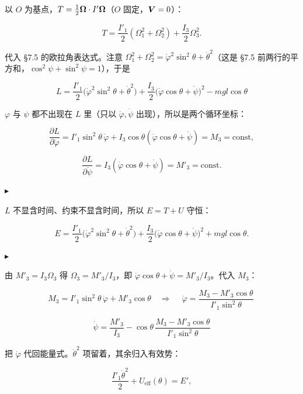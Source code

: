 \documentclass[11pt]{ctexart}
\newcommand{\step}[1]{\par\vspace{3pt}\noindent
  {\color{violet}\small$\blacktriangleright$}\hspace{3pt}{\bfseries\color{violetdeep}#1}\par\vspace{1pt}}
\begin{document}

以 $O$ 为基点，$T=\frac12\boldsymbol{\Omega}\cdot I'\boldsymbol{\Omega}$（$O$ 固定，$\boldsymbol{V}=0$）：

\[
T=\frac{I'_1}{2}(\Omega_1^2+\Omega_2^2)+\frac{I_3}{2}\Omega_3^2 .
\]

代入 \S7.5 的欧拉角表达式。注意 $\Omega_1^2+\Omega_2^2=\dot\varphi^2\sin^2\theta+\dot\theta^2$（这是 \S7.5 前两行的平方和，$\cos^2\psi+\sin^2\psi=1$），于是

\[
\boxed{\ L=\frac{I'_1}{2}\bigl(\dot\varphi^2\sin^2\theta+\dot\theta^2\bigr)
+\frac{I_3}{2}\bigl(\dot\varphi\cos\theta+\dot\psi\bigr)^2-mgl\cos\theta\ }
\]


$\varphi$ 与 $\psi$ 都不出现在 $L$ 里（只以 $\dot\varphi,\dot\psi$ 出现），所以是两个循环坐标：

\[
\frac{\partial L}{\partial\dot\varphi}=I'_1\sin^2\theta\,\dot\varphi+I_3\cos\theta(\dot\varphi\cos\theta+\dot\psi)=M_3=\text{const},
\]

\[
\frac{\partial L}{\partial\dot\psi}=I_3(\dot\varphi\cos\theta+\dot\psi)=M'_3=\text{const}.
\]


\step{能量}
$L$ 不显含时间、约束不显含时间，所以 $E=T+U$ 守恒：

\[
E=\frac{I'_1}{2}\bigl(\dot\varphi^2\sin^2\theta+\dot\theta^2\bigr)
+\frac{I_3}{2}\bigl(\dot\varphi\cos\theta+\dot\psi\bigr)^2+mgl\cos\theta .
\]

\step{解出 $\dot\varphi$ 与 $\dot\psi$}
由 $M'_3=I_3\Omega_3$ 得 $\Omega_3=M'_3/I_3$，即 $\dot\varphi\cos\theta+\dot\psi=M'_3/I_3$。代入 $M_3$：

\[
M_3=I'_1\sin^2\theta\,\dot\varphi+M'_3\cos\theta
\quad\Longrightarrow\quad
\boxed{\ \dot\varphi=\frac{M_3-M'_3\cos\theta}{I'_1\sin^2\theta}\ }
\]

\[
\boxed{\ \dot\psi=\frac{M'_3}{I_3}-\cos\theta\,\frac{M_3-M'_3\cos\theta}{I'_1\sin^2\theta}\ }
\]


把 $\dot\varphi$ 代回能量式。$\dot\theta^2$ 项留着，其余归入有效势：

\[
\frac{I'_1\dot\theta^2}{2}+U_{\text{eff}}(\theta)=E',
\]
\end{document}
